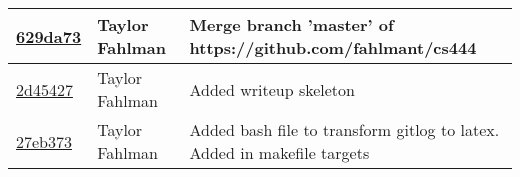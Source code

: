 \begin{tabular}{l l l}
\href{https://github.com/fahlmant/cs444/commit/629da73d1a287be9db4919d9bc27c987acfb7128}{629da73} & Taylor Fahlman & Merge branch 'master' of https://github.com/fahlmant/cs444\\\hline
\href{https://github.com/fahlmant/cs444/commit/2d454270c6b79091f4c1363da7185e3ffbcb2301}{2d45427} & Taylor Fahlman & Added writeup skeleton\\\hline
\href{https://github.com/fahlmant/cs444/commit/27eb37349447092eec979e1d09531408f38ac661}{27eb373} & Taylor Fahlman & Added bash file to transform gitlog to latex. Added in makefile targets\\\hline\end{tabular}
